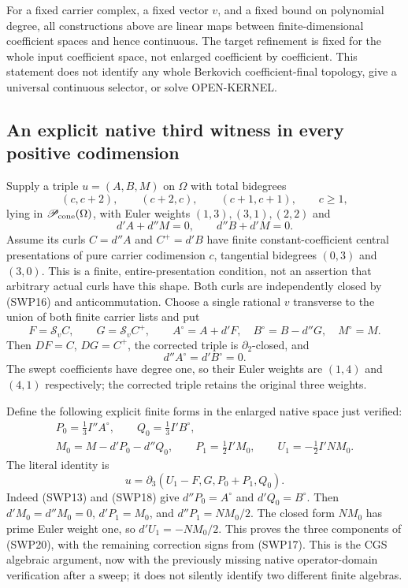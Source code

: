 For a fixed carrier complex, a fixed vector $v$, and a fixed bound
on polynomial degree, all constructions above are linear maps
between finite-dimensional coefficient spaces and hence continuous.
The target refinement is fixed for the whole input coefficient
space, not enlarged coefficient by coefficient.  This statement
does not identify any whole Berkovich coefficient-final topology,
give a universal continuous selector, or solve OPEN-KERNEL.

\subsection{An explicit native third witness in every positive codimension}

Supply a triple $u=(A,B,M)$ on $\Omega$ with total bidegrees
\[
 (c,c+2),\qquad(c+2,c),\qquad(c+1,c+1),\qquad c\ge1,
 \tag{SWP15}
\]
lying in $\mathscr P_{\rm cone}(\Omega)$, with Euler weights
$(1,3),(3,1),(2,2)$ and
\[
                 d'A+d''M=0,\qquad d''B+d'M=0.
 \tag{SWP16}
\]
Assume its curls $C=d''A$ and $C^+=d'B$ have finite
constant-coefficient central presentations of pure carrier
codimension $c$, tangential bidegrees $(0,3)$ and $(3,0)$.
This is a finite, entire-presentation condition, not an assertion
that arbitrary actual curls have this shape.
Both curls are independently closed by (SWP16) and
anticommutation.  Choose a single rational $v$ transverse to the
union of both finite carrier lists and put
\[
 F=\mathcal S_vC,\qquad G=\mathcal S_vC^+,\qquad
 A^\circ=A+d'F,\quad B^\circ=B-d''G,\quad M^\circ=M.
 \tag{SWP17}
\]
Then $DF=C$, $DG=C^+$, the corrected triple is
$\partial_2$-closed, and
\[
                        d''A^\circ=d'B^\circ=0.
 \tag{SWP18}
\]
The swept coefficients have degree one, so their Euler weights are
$(1,4)$ and $(4,1)$ respectively; the corrected triple retains
the original three weights.

Define the following explicit finite forms in the enlarged native
space just verified:
\[
 \begin{gathered}
 P_0=\tfrac13 I''A^\circ,\qquad Q_0=\tfrac13 I'B^\circ,\\
 M_0=M-d'P_0-d''Q_0,\qquad P_1=\tfrac12 I'M_0,\qquad
 U_1=-\tfrac12 I'NM_0.
 \end{gathered}
 \tag{SWP19}
\]
The literal identity is
\[
 \boxed{\quad
 u=\partial_3(U_1-F, G, P_0+P_1, Q_0).
 \quad}
 \tag{SWP20}
\]
Indeed (SWP13) and (SWP18) give $d''P_0=A^\circ$ and
$d'Q_0=B^\circ$.  Then $d'M_0=d''M_0=0$,
$d'P_1=M_0$, and $d''P_1=NM_0/2$.
The closed form $NM_0$ has prime Euler weight one, so
$d'U_1=-NM_0/2$.  This proves the three components of
(SWP20), with the remaining correction signs from (SWP17).
This is the CGS algebraic argument, now with the previously missing
native operator-domain verification after a sweep; it does not
silently identify two different finite algebras.

